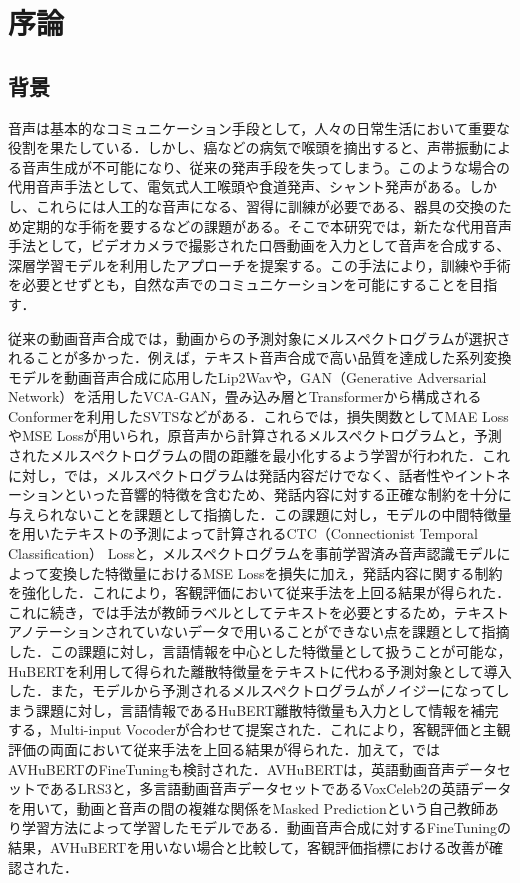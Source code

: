 \section{序論}
\subsection{背景}
音声は基本的なコミュニケーション手段として，人々の日常生活において重要な役割を果たしている．しかし、癌などの病気で喉頭を摘出すると、声帯振動による音声生成が不可能になり、従来の発声手段を失ってしまう。このような場合の代用音声手法として、電気式人工喉頭や食道発声、シャント発声がある。しかし、これらには人工的な音声になる、習得に訓練が必要である、器具の交換のため定期的な手術を要するなどの課題がある。そこで本研究では，新たな代用音声手法として，ビデオカメラで撮影された口唇動画を入力として音声を合成する、深層学習モデルを利用したアプローチを提案する。この手法により，訓練や手術を必要とせずとも，自然な声でのコミュニケーションを可能にすることを目指す．

従来の動画音声合成では，動画からの予測対象にメルスペクトログラムが選択されることが多かった．例えば，テキスト音声合成で高い品質を達成した系列変換モデル\cite{shen2018natural}を動画音声合成に応用したLip2Wav\cite{prajwal2020learning}や，GAN（Generative Adversarial Network）を活用したVCA-GAN\cite{kim2021lip}，畳み込み層とTransformer\cite{vaswani2017attention}から構成されるConformer\cite{gulati2020conformer}を利用したSVTS\cite{mira2022svts}などがある．これらでは，損失関数としてMAE LossやMSE Lossが用いられ，原音声から計算されるメルスペクトログラムと，予測されたメルスペクトログラムの間の距離を最小化するよう学習が行われた．これに対し，\cite{kim2023lip_multitask}では，メルスペクトログラムは発話内容だけでなく、話者性やイントネーションといった音響的特徴を含むため、発話内容に対する正確な制約を十分に与えられないことを課題として指摘した．この課題に対し，モデルの中間特徴量を用いたテキストの予測によって計算されるCTC（Connectionist Temporal Classification） Lossと，メルスペクトログラムを事前学習済み音声認識モデルによって変換した特徴量におけるMSE Lossを損失に加え，発話内容に関する制約を強化した．これにより，客観評価において従来手法を上回る結果が得られた．これに続き，\cite{choi2023intelligible}では手法\cite{kim2023lip_multitask}が教師ラベルとしてテキストを必要とするため，テキストアノテーションされていないデータで用いることができない点を課題として指摘した．この課題に対し，言語情報を中心とした特徴量として扱うことが可能な，HuBERT\cite{hsu2021hubert}を利用して得られた離散特徴量をテキストに代わる予測対象として導入した．また，モデルから予測されるメルスペクトログラムがノイジーになってしまう課題に対し，言語情報であるHuBERT離散特徴量も入力として情報を補完する，Multi-input Vocoderが合わせて提案された．これにより，客観評価と主観評価の両面において従来手法を上回る結果が得られた．加えて，\cite{choi2023intelligible}ではAVHuBERT\cite{shi2022learning}のFineTuningも検討された．AVHuBERTは，英語動画音声データセットであるLRS3\cite{afouras2018lrs3}と，多言語動画音声データセットであるVoxCeleb2\cite{chung2018voxceleb2}の英語データを用いて，動画と音声の間の複雑な関係をMasked Predictionという自己教師あり学習方法によって学習したモデルである．動画音声合成に対するFineTuningの結果，AVHuBERTを用いない場合と比較して，客観評価指標における改善が確認された．


